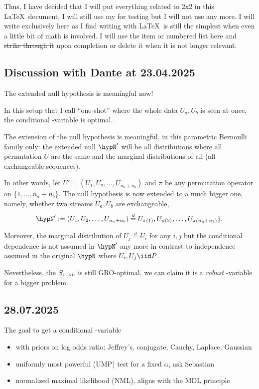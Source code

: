 Thus, I have decided that I will put everything related to 2x2 in this \LaTeX\ document.
I will still use my \personalRepo for testing but I will not use \githubIssue any more.
I will write exclusively here as I find writing with \LaTeX\ is still the simplest
when even a little bit of math is involved.
I will use the item or numbered list here and \sout{strike through it} upon completion
or delete it when it is not longer relevant.

\subsection{Discussion with Dante at 23.04.2025}

The extended null hypothesis is meaningful now!

In this setup that I call ``one-shot'' where the whole data $U_a, U_b$ is seen at once,
the conditional \E-variable is optimal.

The extension of the null hypothesis is meaningful, in this parametric Bernoulli family only:
the extended null $\hypN'$ will be all distributions where all permutation $U$ are the same
and the marginal distributions of all (all exchangeable sequences).

In other words, let $U'=(U_1,U_2,\dots,U_{n_a+n_b})$ and
$\pi$ be any permutation operator on $\{1,\dots,n_a+n_b\}$.
The null hypothesis is now extended to a much bigger one,
namely, whether two streams $U_a, U_b$ are exchangeable,
\begin{align*}
	\hypN':=(U_1,U_2,\dots,U_{n_a+n_b}) \overset{d}{=}
	U_{\pi(1)},U_{\pi(2)},\dots,U_{\pi(n_a+n_b)}\}.
\end{align*}

Moreover, the marginal distribution of $U_j \overset{d}{=} U_i$ for any $i, j$
but the conditional dependence is not assumed in $\hypN'$ any more
in contrast to independence assumed in the original $\hypN$
where $U_i, U_j \iid P$.

Nevertheless, the $S_{\textsc{cond}}$ is still GRO-optimal, we can claim it is a
\textit{robust} \E-variable for a bigger problem.

\subsection{28.07.2025}

The goal to get a conditional \E-variable
\begin{itemize}
	\item with priors on log odds ratio: Jeffrey's, conjugate, Cauchy, Laplace, Gaussian
	\item uniformly most powerful (UMP) test for a fixed $\alpha$, ask Sebastian
	\item normalized maximal likelihood (NML), aligns with the MDL principle
\end{itemize}

